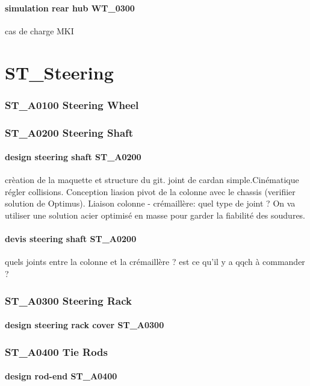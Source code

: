 			\paragraph{simulation rear hub WT\_0300} cas de charge MKI
\newpage 
 \section*{ST\_Steering} 
 \par 
		\subsubsection*{ST\_A0100 Steering Wheel} 
 \par 
		\subsubsection*{ST\_A0200 Steering Shaft} 
 \par 
			\paragraph{design steering shaft ST\_A0200} crèation de la maquette et structure du git. joint de cardan simple.Cinématique régler collisions. Conception liasion pivot de la colonne avec le chassis (verifiier solution de Optimus). Liaison colonne - crémaillère: quel type de joint ? On va utiliser une solution acier optimisé en masse pour garder la fiabilité des soudures.
			\paragraph{devis steering shaft ST\_A0200} quels joints entre la colonne et la crémaillère ? est ce qu'il y a qqch à commander ?
		\subsubsection*{ST\_A0300 Steering Rack} 
 \par 
			\paragraph{design steering rack cover ST\_A0300} 
		\subsubsection*{ST\_A0400 Tie Rods} 
 \par 
			\paragraph{design rod-end ST\_A0400} 

